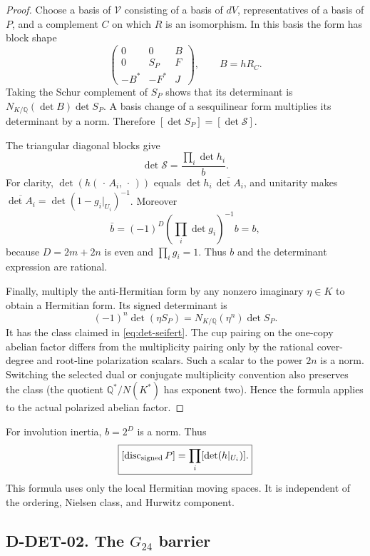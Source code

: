 \begin{proof}
Choose a basis of \(\mathcal V\) consisting of a basis of \(dV\),
representatives of a basis of \(P\), and a complement \(C\) on which
\(R\) is an isomorphism.  In this basis the form has block shape
\[
 \begin{pmatrix}
 0&0&B\\0&S_P&F\\-B^*&-F^*&J
 \end{pmatrix},\qquad B=hR_C.
\]
Taking the Schur complement of \(S_P\) shows that its determinant is
\(N_{K/\mathbb Q}(\det B)\det S_P\).  A basis change of a
sesquilinear form multiplies its determinant by a norm.  Therefore
\([\det S_P]=[\det\mathcal S]\).

The triangular diagonal blocks give
\[
               \det\mathcal S=\frac{\prod_i\det h_i}{b}.
\]
For clarity, \(\det(h(\,\cdot\, A_i,\,\cdot\,))\)
equals \(\det h_i\,\overline{\det A_i}\), and unitarity makes
\(\overline{\det A_i}=\det(1-g_i|_{U_i})^{-1}\).
Moreover
\[
 \bar b=(-1)^D\left(\prod_i\det g_i\right)^{-1}b=b,
\]
because \(D=2m+2n\) is even and \(\prod_i g_i=1\).
Thus \(b\) and the determinant expression are rational.

Finally, multiply the anti-Hermitian form by any nonzero imaginary
\(\eta\in K\) to obtain a Hermitian form.  Its signed determinant is
\[
             (-1)^n\det(\eta S_P)
                   =N_{K/\mathbb Q}(\eta^n)\det S_P.
\]
It has the class claimed in \eqref{eq:det-seifert}.  The cup pairing on
the one-copy abelian factor differs from the multiplicity pairing only
by the rational cover-degree and root-line polarization scalars.  Such
a scalar to the power \(2n\) is a norm.  Switching the selected dual
or conjugate multiplicity convention also preserves the class (the
quotient \(\mathbb Q^*/N(K^*)\) has exponent two).  Hence the formula
applies to the actual polarized abelian factor.
\end{proof}

For involution inertia, \(b=2^D\) is a norm.  Thus
\begin{equation}\label{eq:det-involution}
           \boxed{[\operatorname{disc}_{\rm signed}P]
                    =\prod_i[\det(h|_{U_i})].}
\end{equation}
This formula uses only the local Hermitian moving spaces.  It is
independent of the ordering, Nielsen class, and Hurwitz component.

\subsection*{D-DET-02. The \(G_{24}\) barrier}

